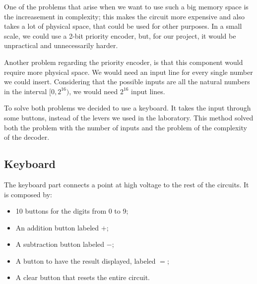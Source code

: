 \documentclass{article}
\begin{document}
\vspace{3mm}

One of the problems that arise when we want to use such a big memory space is the increasement in complexity; this makes the circuit more expensive and also takes a lot of physical space, that could be used for other purposes. In a small scale, we could use a 2-bit priority encoder, but, for our project, it would be unpractical and unnecessarily harder.

\vspace{3mm}

Another problem regarding the priority encoder, is that this component would require more physical space. We would need an input line for every single number we could insert. Considering that the possible inputs are all the natural numbers in the interval $[0,2^{16})$, we would need $2^{16}$ input lines.

\vspace{3mm}

To solve both problems we decided to use a keyboard. It takes the input through some buttons, instead of the levers we used in the laboratory. This method solved both the problem with the number of inputs and the problem of the complexity of the decoder.



\subsection{Keyboard}

The keyboard part connects a point at high voltage to the rest of the circuits. It is composed by: 

\begin{itemize}
    \item 10 buttons for the digits from 0 to 9;
    \item An addition button labeled $+$;
    \item A subtraction button labeled $-$;
    \item A button to have the result displayed, labeled $=$;
    \item A clear button that resets the entire circuit.
\end{itemize}
\end{document}
